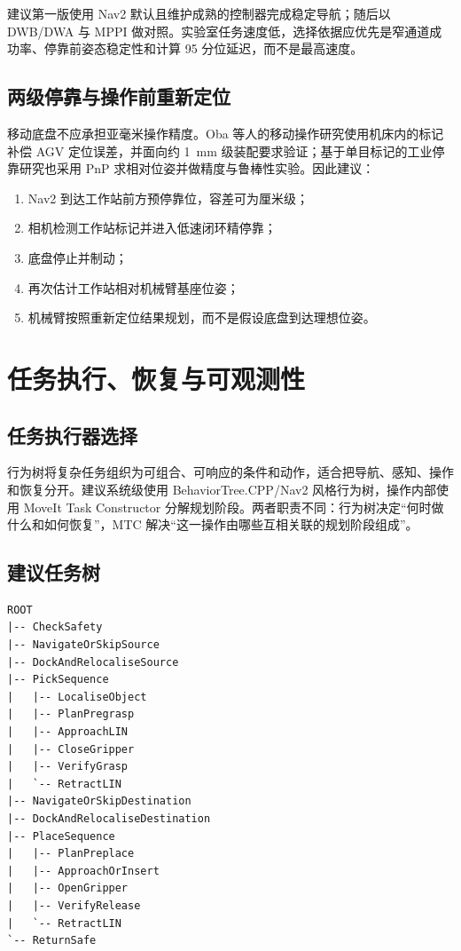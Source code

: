 \documentclass[UTF8,12pt,oneside]{ctexrep}
\begin{document}
建议第一版使用 Nav2 默认且维护成熟的控制器完成稳定导航；随后以 DWB/DWA 与 MPPI 做对照。实验室任务速度低，选择依据应优先是窄通道成功率、停靠前姿态稳定性和计算 95 分位延迟，而不是最高速度。

\section{两级停靠与操作前重新定位}

移动底盘不应承担亚毫米操作精度。Oba 等人的移动操作研究使用机床内的标记补偿 AGV 定位误差，并面向约 \SI{1}{mm} 级装配要求验证\cite{oba2021mobilemanipulator}；基于单目标记的工业停靠研究也采用 PnP 求相对位姿并做精度与鲁棒性实验\cite{petr2023docking}。因此建议：

\begin{enumerate}
  \item Nav2 到达工作站前方预停靠位，容差可为厘米级；
  \item 相机检测工作站标记并进入低速闭环精停靠；
  \item 底盘停止并制动；
  \item 再次估计工作站相对机械臂基座位姿；
  \item 机械臂按照重新定位结果规划，而不是假设底盘到达理想位姿。
\end{enumerate}

\chapter{任务执行、恢复与可观测性}

\section{任务执行器选择}

行为树将复杂任务组织为可组合、可响应的条件和动作，适合把导航、感知、操作和恢复分开\cite{colledanchise2018bt}。建议系统级使用 BehaviorTree.CPP/Nav2 风格行为树，操作内部使用 MoveIt Task Constructor 分解规划阶段。两者职责不同：行为树决定“何时做什么和如何恢复”，MTC 解决“这一操作由哪些互相关联的规划阶段组成”。

\section{建议任务树}

\begin{lstlisting}
ROOT
|-- CheckSafety
|-- NavigateOrSkipSource
|-- DockAndRelocaliseSource
|-- PickSequence
|   |-- LocaliseObject
|   |-- PlanPregrasp
|   |-- ApproachLIN
|   |-- CloseGripper
|   |-- VerifyGrasp
|   `-- RetractLIN
|-- NavigateOrSkipDestination
|-- DockAndRelocaliseDestination
|-- PlaceSequence
|   |-- PlanPreplace
|   |-- ApproachOrInsert
|   |-- OpenGripper
|   |-- VerifyRelease
|   `-- RetractLIN
`-- ReturnSafe
\end{lstlisting}
\end{document}
